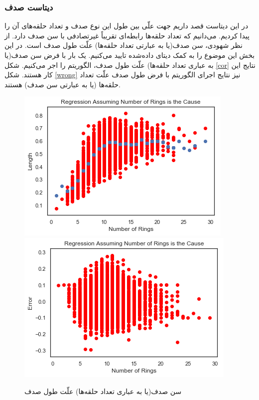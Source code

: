 \documentclass{article}
\begin{document}
\subsubsection{دیتاست صدف}
در این دیتاست قصد داریم جهت علّی بین طول این نوع صدف و تعداد حلقه‌های آن را پیدا کردیم. می‌دانیم که تعداد حلقه‌ها رابطه‌ای تقریباً غیرتصادفی با سن  صدف دارد. از نظر شهودی،‌ سن صدف(یا به عبارتی تعداد حلقه‌ها) علّت طول صدف است. در این بخش این موضوع را به کمک دیتای داده‌شده تایید می‌کنیم.
یک بار با فرض سن صدف(یا به عباری تعداد حلقه‌ها) علّت طول صدف، الگوریتم را اجر می‌کنیم. شکل 
\eqref{cor}
نتایج این کار هستند. شکل 
\eqref{wrong}
نیز نتایج اجرای الگوریتم با فرض طول صدف علّت تعداد حلقه‌ها (یا به عبارتی سن صدف) هستند.
\begin{figure}[h!]
\centering
\begin{floatrow}
\includegraphics[scale=0.4]{aba_for1.png}
\includegraphics[scale=0.4]{aba_for2.png}
\end{floatrow}
\caption{ سن صدف(یا به عباری تعداد حلقه‌ها) علّت طول صدف}
\label{cor}
\end{figure}
\end{document}
